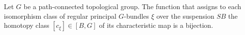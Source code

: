 Let $G$ be a path-connected topological group. The function that assigns to each isomorphism class of regular principal $G$-bundles $\xi$ over the suspension $SB$ the homotopy class $[c_\xi] \in [B, G]$ of its characteristic map is a bijection.
